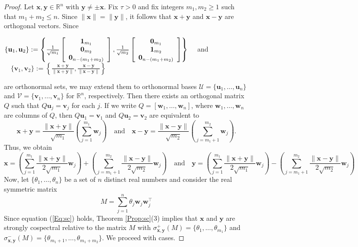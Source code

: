 \documentclass[11pt]{article}
\newcommand{\zero}{{\bf{0}}}
\newcommand{\ones}{{\bf{1}}}
\newcommand{\bv}{\mathbf v}
\newcommand{\bx}{\mathbf x}
\newcommand{\by}{\mathbf y}
\newcommand{\bu}{\mathbf u}
\newcommand{\bw}{\mathbf w}
\def\R{\mathbb{R}}
\begin{document}
\begin{proof}
Let $\bx,\by\in\R^n$ with $\by\neq\pm \bx$. Fix $\tau>0$ and fix integers $m_1,m_2\geq 1$ such that $m_1+m_2\leq n$. Since $\|\bx\|=\|\by\|$, it follows that $\bx+\by$ and $\bx-\by$ are orthogonal vectors. Since
\begin{center}
$\{\bu_1,\bu_2\}:=\left\{\frac{1}{\sqrt{m_1}}\left[\begin{array}{ccc} \ones_{m_1} \\ \zero_{m_2} \\ \zero_{n-(m_1+m_2)} \end{array} \right],\frac{1}{\sqrt{m_2}}\left[\begin{array}{ccc} \zero_{m_1} \\ \ones_{m_2} \\ \zero_{n-(m_1+m_2)} \end{array} \right]\right\}\quad $ and $\quad \{\bv_1,\bv_2\}:=\left\{\frac{\bx+\by}{\|\bx+\by\|},\frac{\bx-\by}{\|\bx-\by\|}\right\}$    
\end{center}
are orthonormal sets, we may extend them to orthonormal bases $\mathcal{U}=\{\bu_1,\ldots,\bu_n\}$ and $\mathcal{V}=\{\bv_1,\ldots,\bv_n\}$ for $\R^n$, respectively. Then there exists an orthogonal matrix $Q$ such that $Q\bu_j=\bv_j$ for each $j$. If we write $Q=[\bw_1,\ldots,\bw_n]$, where $\bw_1,\ldots,\bw_n$ are columns of $Q$, then $Q\bu_1=\bv_1$ and $Q\bu_2=\bv_2$ are equivalent to
\begin{equation*}
\bx+\by=\displaystyle\frac{\|\bx+\by\|}{\sqrt{m_1}}\left(\sum_{j=1}^{m_1}\bw_j\right)\quad \text{and} \quad \bx-\by=\displaystyle\frac{\|\bx-\by\|}{\sqrt{m_2}}\left(\sum_{j=m_1+1}^{m_2}\bw_j\right).
\end{equation*}
Thus, we obtain
\begin{equation}
\label{Eq:sc}
\bx=\displaystyle\left(\sum_{j=1}^{m_1}\displaystyle\frac{\|\bx+\by\|}{2\sqrt{m_1}}\bw_j\right)+\left(\sum_{j=m_1+1}^{m_2}\displaystyle\frac{\|\bx-\by\|}{2\sqrt{m_2}}\bw_j\right)\quad \text{and} \quad \by=\displaystyle\left(\sum_{j=1}^{m_1}\displaystyle\frac{\|\bx+\by\|}{2\sqrt{m_1}}\bw_j\right)-\left(\sum_{j=m_1+1}^{m_2}\displaystyle\frac{\|\bx-\by\|}{2\sqrt{m_2}}\bw_j\right)
\end{equation}
Now, let 
$\{\theta_1,\ldots,\theta_{n}\}$ be a set of $n$ distinct real numbers and consider the real symmetric matrix
\begin{equation*}
M=\sum_{j=1}^{n}\theta_j\bw_j\bw_j^\top
\end{equation*}
Since equation (\ref{Eq:sc}) holds, Theorem \ref{Prop:sc}(3) implies that $\bx$ and $\by$ are strongly cospectral relative to the matrix $M$ with $\sigma_{\bx,\by}^+(M)=\{\theta_1,\ldots,\theta_{m_1}\}$ and $\sigma_{\bx,\by}^-(M)=\{\theta_{m_1+1},\ldots,\theta_{m_1+m_2}\}$. We proceed with cases.


\end{proof}
\end{document}
